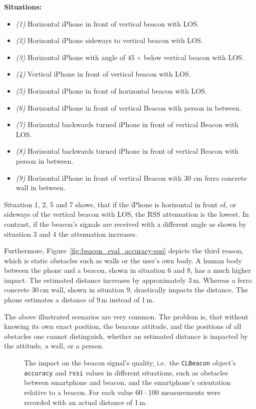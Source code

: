 \textbf{Situations:}
\begin{itemize}
  \item \emph{(1)} Horizontal iPhone in front of vertical beacon with \acs{LOS}.
  \item \emph{(2)} Horizontal iPhone sideways to vertical beacon with \acs{LOS}.
  \item \emph{(3)} Horizontal iPhone with angle of $45~\circ$ below vertical beacon with \acs{LOS}.
  \item \emph{(4)} Vertical iPhone in front of vertical beacon with \acs{LOS}.
  \item \emph{(5)} Horizontal iPhone in front of horizontal beacon with \acs{LOS}.
  \item \emph{(6)} Horizontal iPhone in front of vertical Beacon with person in between.
  \item \emph{(7)} Horizontal backwards turned iPhone in front of vertical Beacon with \acs{LOS}.
  \item \emph{(8)} Horizontal backwards turned iPhone in front of vertical Beacon with person in between.
  \item \emph{(9)} Horizontal iPhone in front of vertical Beacon with 30 cm ferro concrete wall in between.
\end{itemize}

\noindent Situation 1, 2, 5 and 7 shows, that if the iPhone is horizontal in front of, or sideways of the vertical beacon with \acs{LOS}, the \acs{RSS} attenuation is the lowest. In contrast, if the beacon's signals are received with a different angle as shown by situation 3 and 4 the attenuation increases.

Furthermore, Figure~\ref{fig:beacon_eval_accuracy-rssi} depicts the third reason, which is static obstacles such as walls or the user's own body. A human body between the phone and a beacon, shown in situation 6 and 8, has a much higher impact. The estimated distance increases by approximately 3\,m. Whereas a ferro concrete 30\,cm wall, shown in situation 9, drastically impacts the distance. The phone estimates a distance of 9\,m instead of 1\,m.

The above illustrated scenarios are very common. The problem is, that without knowing its own exact position, the beacons attitude, and the positions of all obstacles one cannot distinguish, whether an estimated distance is impacted by the attitude, a wall, or a person.

\begin{figure}
	
	\caption {The impact on the beacon signal's quality, i.e.\ the \texttt{CLBeacon} object's \texttt{accuracy} and \texttt{rssi} values in different situations, such as obstacles between smartphone and beacon, and the smartphone's orientation relative to a beacon. For each value 60\,--\,100 measurements were recorded with an actual distance of 1\,m.}
	\label{fig:beacon_eval_situations}
\end{figure}


